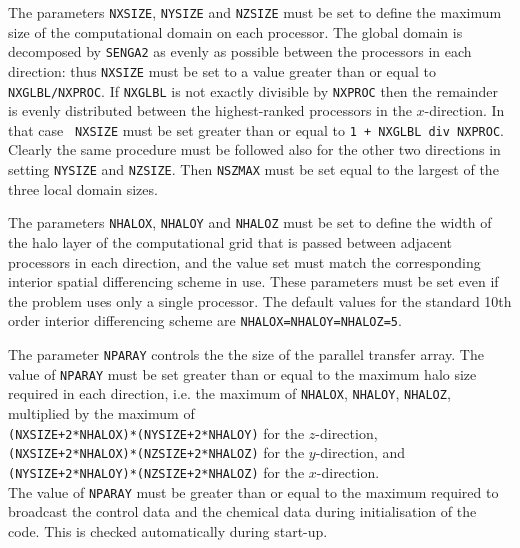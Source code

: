\documentclass[dvips]{article}
\begin{document}
The parameters {\tt NXSIZE}, {\tt NYSIZE} and {\tt NZSIZE} must be set to
define the maximum size of the computational
domain on each processor.  The global domain is decomposed by {\tt SENGA2}
as evenly as possible between the processors in each direction: thus
{\tt NXSIZE} must be set to a value greater than or equal to 
{\tt NXGLBL/NXPROC}.  If {\tt NXGLBL} is not exactly divisible by
{\tt NXPROC} then the remainder is evenly distributed between the
highest-ranked processors in the $x$-direction.  In that case {\tt
NXSIZE} must be set greater than or equal to {\tt 1 + NXGLBL div NXPROC}.
Clearly the same procedure must be followed also for the other two directions
in setting {\tt NYSIZE} and {\tt NZSIZE}.  Then {\tt NSZMAX} must be set
equal to the largest of the three local domain sizes.

The parameters {\tt NHALOX}, {\tt NHALOY} and {\tt NHALOZ}  must be set to
define the width of the halo
layer of the computational grid that is passed between adjacent
processors in each direction, and the value set must match the
corresponding interior spatial
differencing scheme in use.  These parameters must be set even if the
problem uses only a single processor.  The default values for the standard 10th
order interior differencing scheme are {\tt NHALOX=NHALOY=NHALOZ=5}.

The parameter {\tt NPARAY} controls the the size of the parallel transfer
array.  The value of
{\tt NPARAY} must be set greater than or equal to the maximum halo size
required in each direction, i.e. the maximum of
{\tt NHALOX}, {\tt NHALOY}, {\tt NHALOZ}, multiplied by the maximum of\\
{\tt (NXSIZE+2*NHALOX)*(NYSIZE+2*NHALOY)} for the $z$-direction,\\
{\tt (NXSIZE+2*NHALOX)*(NZSIZE+2*NHALOZ)} for the $y$-direction, and\\
{\tt (NYSIZE+2*NHALOY)*(NZSIZE+2*NHALOZ)} for the $x$-direction.\\
The value of {\tt NPARAY} must be greater than or equal to the
maximum required to broadcast the control data and the chemical data
during initialisation of the code.  This is checked automatically during
start-up.\\
\end{document}
